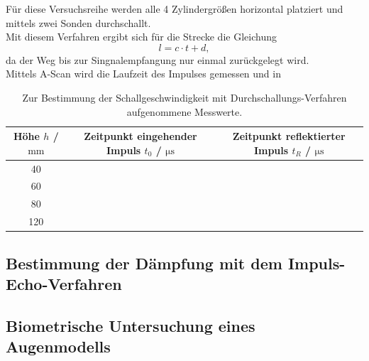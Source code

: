 Für diese Versuchsreihe werden alle 4 Zylindergrößen horizontal platziert und mittels zwei Sonden durchschallt.\\
Mit diesem Verfahren ergibt sich für die Strecke die Gleichung 
\begin{equation}
  l = c \cdot t + d,
\end{equation}
da der Weg bis zur Singnalempfangung nur einmal zurückgelegt wird.\\
Mittels A-Scan wird die Laufzeit des Impulses gemessen und in %
\begin{table}
  \centering
  \caption{Zur Bestimmung der Schallgeschwindigkeit mit Durchschallungs-Verfahren aufgenommene Messwerte.}
  \label{tab:Durchschallung}
  \begin{tabular}{c | c c}
    Höhe $h$ / $\si{\milli\meter}$ & Zeitpunkt eingehender Impuls $t_0$ / $\si{\micro\second}$ & Zeitpunkt reflektierter Impuls $t_R$ / $\si{\micro\second}$ \\
       \midrule
         40   & & \\
         60   & & \\
         80   & & \\
         120  & & \\
      \bottomrule
    \end{tabular}
\end{table}


\subsection{Bestimmung der Dämpfung mit dem Impuls-Echo-Verfahren}

\subsection{Biometrische Untersuchung eines Augenmodells}